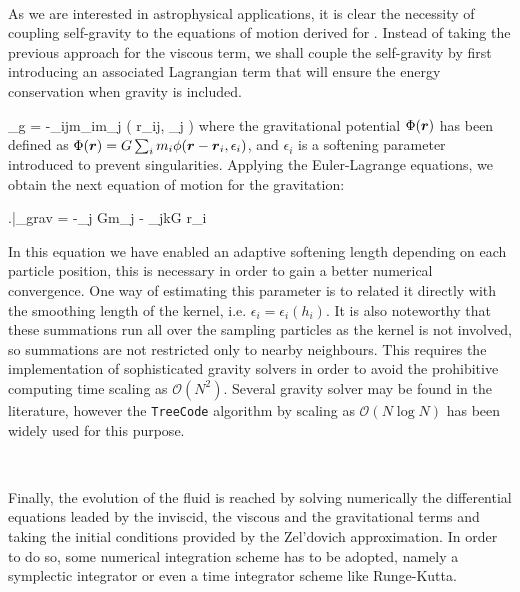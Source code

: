 \documentclass[a4,useAMS,usenatbib,usegraphicx,12pt]{article}
\begin{document}
\

As we are interested in astrophysical applications, it is clear the necessity 
of coupling self-gravity to the equations of motion derived for \SPH. Instead 
of taking the previous approach for the viscous term, we shall couple the
self-gravity by first introducing an associated Lagrangian term that will
ensure the energy conservation when gravity is included.

{ _g = -\sum_{i\neq j}m_im_j \phi( r_{ij}, \epsilon_j ) }
where the gravitational potential $\Phi(\boldsymbol{ r })$ has been defined as 
$\Phi(\boldsymbol{ r }) = G \sum_i m_i \phi(\boldsymbol{ r } - \boldsymbol{ r }_i, \epsilon_i)$, and $\epsilon_i$
is a softening parameter introduced to prevent singularities. Applying the 
Euler-Lagrange equations, we obtain the next equation of motion for the 
gravitation:


{ \left.\right|_{\mbox{\footnotesize{grav}}} = 
-\sum_j Gm_j  - \sum_{j\neq k}G
{\partial \bds r_i} }


In this equation we have enabled an adaptive softening length depending on each 
particle position, this is necessary in order to gain a better numerical 
convergence. One way of estimating this parameter is to related it directly with
the smoothing length of the kernel, i.e. $\epsilon_i = \epsilon_i(h_i)$. It is 
also noteworthy that these summations run all over the sampling particles as the 
kernel is not involved, so summations are not restricted only to nearby neighbours. 
This requires the implementation of sophisticated gravity solvers in order to 
avoid the prohibitive computing time scaling as $\mathcal{O}(N^2)$. Several 
gravity solver may be found in the literature, however the \texttt{TreeCode} 
algorithm by \citet{barnes1986} scaling as $\mathcal{O}(N\log N)$ has been widely 
used for this purpose.

\

Finally, the evolution of the fluid is reached by solving numerically the 
differential equations leaded by the inviscid, the viscous and the gravitational 
terms and taking the initial conditions provided by the Zel'dovich approximation. 
In order to do so, some numerical integration scheme has to be adopted, namely a 
symplectic integrator or even a time integrator scheme like Runge-Kutta.
\end{document}
